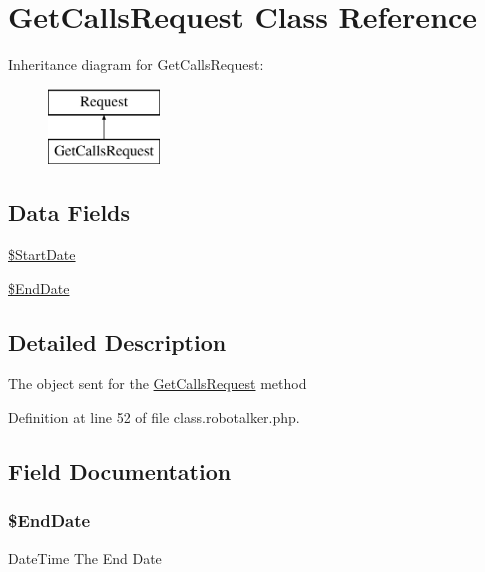 \hypertarget{class_get_calls_request}{\section{Get\-Calls\-Request Class Reference}
\label{class_get_calls_request}
}
Inheritance diagram for Get\-Calls\-Request\-:\begin{figure}[H]
\begin{center}
\leavevmode
\includegraphics[height=2.000000cm]{class_get_calls_request}
\end{center}
\end{figure}
\subsection*{Data Fields}
\begin{DoxyCompactItemize}
\item 
\hyperlink{class_get_calls_request_a82e0539eeca49a1fbea42227a8f96d31}{\$\-Start\-Date}
\item 
\hyperlink{class_get_calls_request_a3ba74dcdb03b05077309a0b5a0c6788e}{\$\-End\-Date}
\end{DoxyCompactItemize}


\subsection{Detailed Description}
The object sent for the \hyperlink{class_get_calls_request}{Get\-Calls\-Request} method 

Definition at line 52 of file class.\-robotalker.\-php.



\subsection{Field Documentation}
\hypertarget{class_get_calls_request_a3ba74dcdb03b05077309a0b5a0c6788e}{
\subsubsection[{\$\-End\-Date}]{\setlength{\rightskip}{0pt plus 5cm}\$End\-Date}}\label{class_get_calls_request_a3ba74dcdb03b05077309a0b5a0c6788e}
Date\-Time The End Date 

